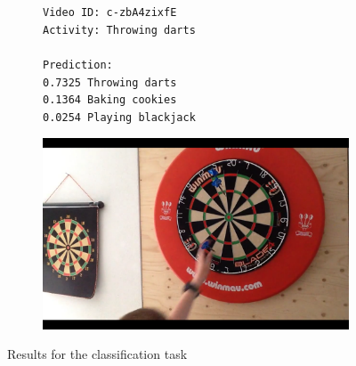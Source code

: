 \begin{figure}[H]
\centering
\begin{subfigure}[b]{.4\textwidth}
  \texttt{Video ID: c-zbA4zixfE \\
  Activity: Throwing darts \\
  \\
  Prediction: \\
  0.7325	Throwing darts \\
  0.1364	Baking cookies \\
  0.0254	Playing blackjack \\}
\end{subfigure}%
\begin{subfigure}[b]{.6\textwidth}
  \centering
\includegraphics[width=0.95\linewidth]{img/results/results_visualization_classification_5}
\end{subfigure}

\caption{Results for the classification task}
\label{fig:results_visualization_classification_annex}
\end{figure}


